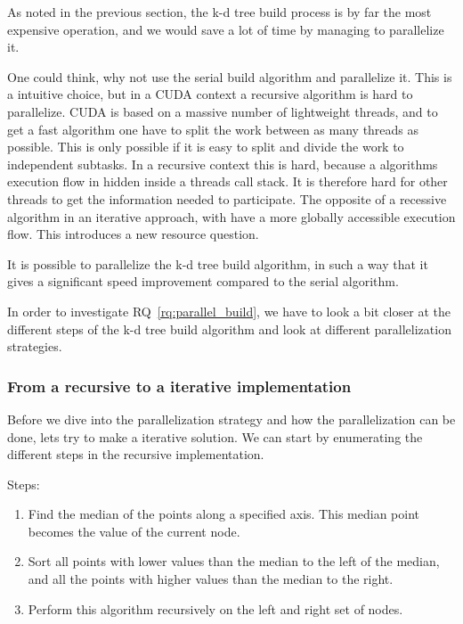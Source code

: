 
As noted in the previous section, the k-d tree build process is by far the most expensive operation, and we would save a lot of time by managing to parallelize it.

One could think, why not use the serial build algorithm and parallelize it. This is a intuitive choice, but in a CUDA context a recursive algorithm is hard to parallelize. CUDA is based on a massive number of lightweight threads, and to get a fast algorithm one have to split the work between as many threads as possible. This is only possible if it is easy to split and divide the work to independent subtasks. In a recursive context this is hard, because a algorithms execution flow in hidden inside a threads call stack. It is therefore hard for other threads to get the information needed to participate. The opposite of a recessive algorithm in an iterative approach, with have a more globally accessible execution flow. This introduces a new resource question.

\begin{myrq}
\label{rq:parallel_build}
    It is possible to parallelize the k-d tree build algorithm, in such a way that it gives a significant speed improvement compared to the serial algorithm.
\end{myrq}

In order to investigate RQ~\ref{rq:parallel_build}, we have to look a bit closer at the different steps of the k-d tree build algorithm and look at different parallelization strategies.


\subsubsection{From a recursive to a iterative implementation} %
\label{ssub:from_recursive_to_iterative_implementation}


Before we dive into the parallelization strategy and how the parallelization can be done, lets try to make a iterative solution. We can start by enumerating the different steps in the recursive implementation.

Steps:
\begin{enumerate}
    \item Find the median of the points along a specified axis. This median point becomes the value of the current node.
    \item Sort all points with lower values than the median to the left of the median, and all the points with higher values than the median to the right.
    \item Perform this algorithm recursively on the left and right set of nodes.
\end{enumerate}

